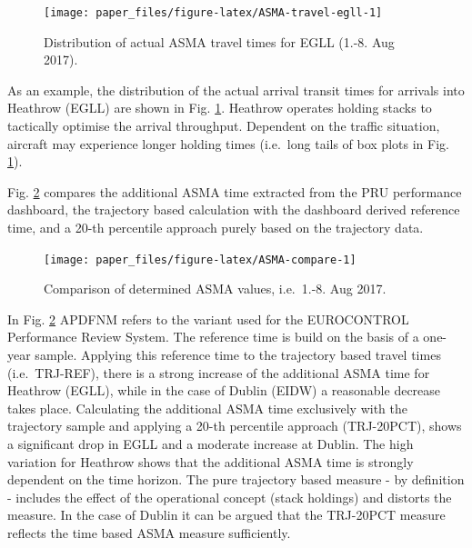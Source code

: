 \documentclass[conference,final,a4paper,]{IEEEtran}
\begin{document}
\begin{figure}[hbt]

{\centering \texttt{[image: paper\_files/figure-latex/ASMA-travel-egll-1]} 

}

\caption{Distribution of actual ASMA travel times for EGLL (1.-8. Aug 2017).}\label{fig:ASMA-travel-egll}
\end{figure}

As an example, the distribution of the actual arrival transit times for arrivals into Heathrow (EGLL) are shown in Fig. \ref{fig:ASMA-travel-egll}. Heathrow operates holding stacks to tactically optimise the arrival throughput.
Dependent on the traffic situation, aircraft may experience longer holding times (i.e.~long tails of box plots in Fig. \ref{fig:ASMA-travel-egll}).

Fig. \ref{fig:ASMA-compare} compares the additional ASMA time extracted from the PRU performance dashboard, the trajectory based calculation with the dashboard derived reference time, and a 20-th percentile approach purely based on the trajectory data.



\begin{figure}[hbt]

{\centering \texttt{[image: paper\_files/figure-latex/ASMA-compare-1]} 

}

\caption{Comparison of determined ASMA values, i.e.~1.-8. Aug 2017.}\label{fig:ASMA-compare}
\end{figure}

In Fig. \ref{fig:ASMA-compare}
APDFNM refers to the variant used for the EUROCONTROL Performance Review System. The reference time is build on the basis of a one-year sample. Applying this reference time to the trajectory based travel times (i.e.~TRJ-REF), there is a strong increase of the additional ASMA time for Heathrow (EGLL), while in the case of Dublin (EIDW) a reasonable decrease takes place. Calculating the additional ASMA time exclusively with the trajectory sample and applying a 20-th percentile approach (TRJ-20PCT), shows a significant drop in EGLL and a moderate increase at Dublin. The high variation for Heathrow shows that the additional ASMA time is strongly dependent on the time horizon.
The pure trajectory based measure - by definition - includes the effect of the operational concept (stack holdings) and distorts the measure. In the case of Dublin it can be argued that the TRJ-20PCT measure reflects the time based ASMA measure sufficiently.
\end{document}

